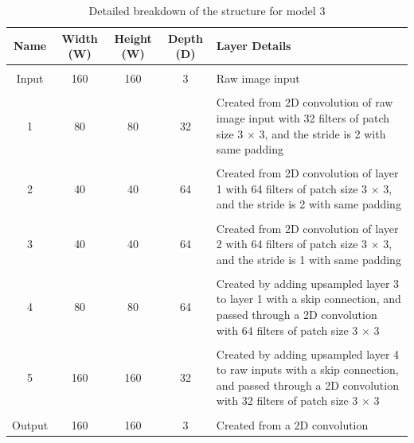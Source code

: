 \documentclass[a4paper]{article}
\begin{document}
\begin{table}[h]
\centering
\caption{Detailed breakdown of the structure for model 3}\scriptsize
\begin{tabular}{ccccp{8cm}}
\toprule
\textbf{Name} & \textbf{Width (W)} & \textbf{Height (W)} & \textbf{Depth (D)} & Layer Details\\  
\midrule
 & & & &\\
Input & 160 & 160 & 3 & Raw image input\\
 & & & &\\
1 & 80 & 80 & 32 & Created from 2D convolution of raw image input with 32 filters of patch size 3 $\times $ 3, and the stride is 2 with same padding\\
 & & & &\\
2 & 40 & 40 & 64 & Created from 2D convolution of layer 1 with 64 filters of patch size 3 $\times $ 3, and the stride is 2 with same padding\\
 & & & &\\
3 & 40 & 40 & 64 & Created from 2D convolution of layer 2 with 64 filters of patch size 3 $\times$ 3, and the stride is 1 with same padding\\
 & & & &\\
4 & 80 & 80 & 64 & Created by adding upsampled layer 3 to layer 1 with a skip connection, and passed through a 2D convolution with 64 filters of patch size 3 $\times$ 3\\
 & & & &\\
5 & 160 & 160 & 32 & Created by adding upsampled layer 4 to raw inputs with a skip connection, and passed through a 2D convolution with 32 filters of patch size 3 $\times$ 3\\
& & & &\\
Output & 160 & 160 & 3 & Created from a 2D convolution\\
\bottomrule
\end{tabular}
\end{table}

\clearpage
\end{document}
